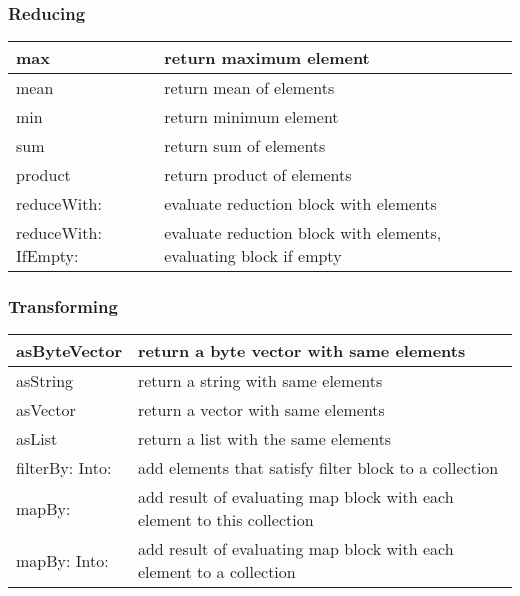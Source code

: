 \documentclass[letterpaper,10pt,english]{sphinxmanual}
\begin{document}
\subsubsection{Reducing}
\label{\detokenize{usefulselectors:reducing}}
\noindent\begin{tabulary}{\linewidth}{p{5cm} p{10cm}}
\hline

max
&
return maximum element
\\
\hline
mean
&
return mean of elements
\\
\hline
min
&
return minimum element
\\
\hline
sum
&
return sum of elements
\\
\hline
product
&
return product of elements
\\
\hline
reduceWith:
&
evaluate reduction block with elements
\\
\hline
reduceWith: IfEmpty:
&
evaluate reduction block with elements, evaluating block if empty
\\
\hline\end{tabulary}



\subsubsection{Transforming}
\label{\detokenize{usefulselectors:transforming}}
\noindent\begin{tabulary}{\linewidth}{p{5cm} p{10cm}}
\hline

asByteVector
&
return a byte vector with same elements
\\
\hline
asString
&
return a string with same elements
\\
\hline
asVector
&
return a vector with same elements
\\
\hline
asList
&
return a list with the same elements
\\
\hline
filterBy: Into:
&
add elements that satisfy filter block to a collection
\\
\hline
mapBy:
&
add result of evaluating map block with each element to this collection
\\
\hline
mapBy: Into:
&
add result of evaluating map block with each element to a collection
\\
\hline\end{tabulary}
\end{document}
